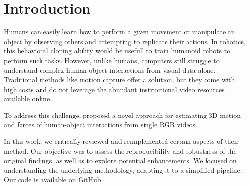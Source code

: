 \section{Introduction}
\label{sec:intro}

Humans can easily learn how to perform a given movement or manipulate an object by observing others and attempting to replicate their actions. 
In robotics, this behavioral cloning ability would be usefull to train humanoid robots to perform such tasks. 
However, unlike humans, computers still struggle to understand complex human-object interactions from visual data alone. 
Traditional methods like motion capture offer a solution, but they come with high costs and do not leverage the abundant instructional video 
resources available online.

To address this challenge, \citet{li2019estimating} proposed a novel approach for estimating 3D motion and forces of human-object interactions 
from single RGB videos. 

In this work, we critically reviewed and reimplemented certain aspects of their method. Our objective was to assess 
the reproducibility and robustness of the original findings, as well as to explore potential enhancements. We focused on understanding the 
underlying methodology, adapting it to a simplified pipeline. Our code is available on 
\href{https://github.com/balthazarneveu/monocular_pose_and_forces_estimation}{GitHub}.


